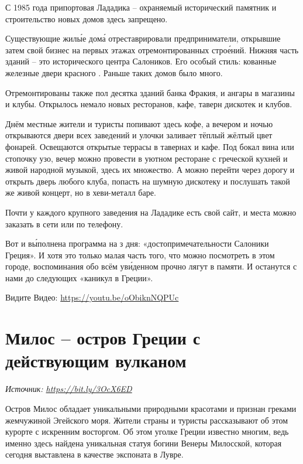С 1985 года припортовая Лададика -- охраняемый исторический памятник и строительство новых домов здесь запрещено.

Существующие жил\'{ы}е дом\'{а} отреставрировали предприниматели, открывшие затем свой бизнес на первых этажах отремонтированных стро\'{е}ний. Нижняя часть зданий -- это  исторического центра Салоников. Его особый стиль: кованные железные двери  красного . Раньше таких домов было много.

Отремонтированы также пол десятка зданий банка Фракия,  и ангары  в магазины и клубы. Открылось немало новых ресторанов, кафе, таверн дискотек и клубов.

Днём местные жители и туристы  попивают здесь кофе, а вечером и ночью открываются двери всех заведений и улочки заливает тёплый жёлтый цвет фонарей. Освещаются открытые террасы в тавернах и кафе. Под бокал вина или стопочку узо, вечер можно провести в уютном ресторане с греческой кухней и живой народной музыкой, здесь их множество. А можно перейти через дорогу и открыть дверь любого клуба, попасть на шумную дискотеку и послушать такой же живой концерт, но в хеви-металл баре.

Почти у каждого  крупного заведения на Лададике есть свой сайт, и места можно заказать  в сети или по телефону.

Вот и в\'{ы}полнена программа на з дня: «достопримечательности Салоники Греция». И хотя это только малая часть того, что можно посмотреть в этом городе, воспоминания обо всём ув\'{и}денном прочно лягут в  памяти. И останутся с нами до следующих «каникул в Греции».

Видите Видео: \url{https://youtu.be/oObiknNQPUc}



\section{Милос – остров Греции с действующим вулканом}

\textit{Источник: \url{https://bit.ly/3OcX6ED}}

Остров Милос обладает уникальными природными красотами и признан греками жемчужиной Эгейского моря. Жители страны и туристы рассказывают об этом курорте с искренним восторгом. Об этом уголке Греции известно многим, ведь именно здесь найдена уникальная статуя богини Венеры Милосской, которая сегодня выставлена в качестве экспоната в Лувре.

